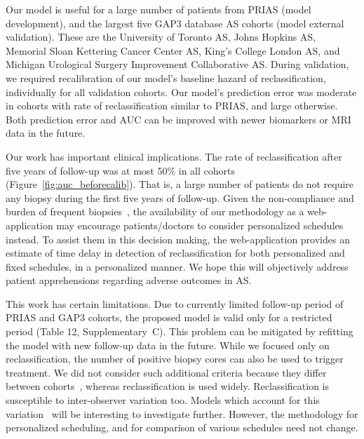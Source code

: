 Our model is useful for a large number of patients from PRIAS (model development), and the largest five GAP3 database AS cohorts (model external validation). These are the University of Toronto AS, Johns Hopkins AS, Memorial Sloan Kettering Cancer Center AS, King's College London AS, and Michigan Urological Surgery Improvement Collaborative AS. During validation, we required recalibration of our model's baseline hazard of reclassification, individually for all validation cohorts. Our model's prediction error was moderate in cohorts with rate of reclassification similar to PRIAS, and large otherwise. Both prediction error and AUC can be improved with newer biomarkers or MRI data in the future.

Our work has important clinical implications. The rate of reclassification after five years of follow-up was at most 50\% in all cohorts (Figure~\ref{fig:auc_beforecalib}). That is, a large number of patients do not require any biopsy during the first five years of follow-up. Given the non-compliance and burden of frequent biopsies~\citep{bokhorst2015compliance}, the availability of our methodology as a web-application may encourage patients/doctors to consider personalized schedules instead. To assist them in this decision making, the web-application provides an estimate of time delay in detection of reclassification for both personalized and fixed schedules, in a personalized manner. We hope this will objectively address patient apprehensions regarding adverse outcomes in AS.

This work has certain limitations. Due to currently limited follow-up period of PRIAS and GAP3 cohorts, the proposed model is valid only for a restricted period (Table 12, Supplementary~C). This problem can be mitigated by refitting the model with new follow-up data in the future. While we focused only on reclassification, the number of positive biopsy cores can also be used to trigger treatment. We did not consider such additional criteria because they differ between cohorts~\citep{nieboer2018active}, whereas reclassification is used widely. Reclassification is susceptible to inter-observer variation too. Models which account for this variation~\citep{coley2017prediction,balasubramanian2003estimation} will be interesting to investigate further. However, the methodology for personalized scheduling, and for comparison of various schedules need not change.